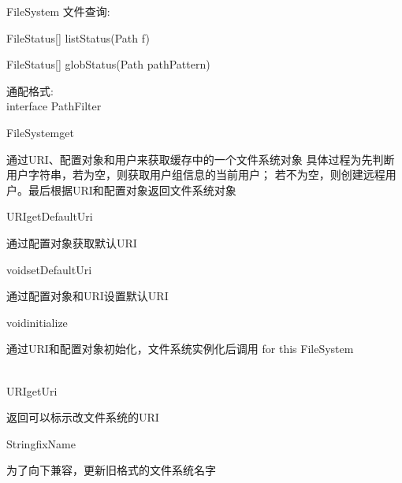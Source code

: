 \begin{XeClass}{FileSystem}
 文件查询: \\
 \begin{XeEnum}
 \item FileStatus[] listStatus(Path f)
 \item FileStatus[] globStatus(Path pathPattern)
 \end{XeEnum}
  
 通配格式: \\
 interface PathFilter

    \begin{XeMethod}{\XePublic}{FileSystem}{get}
         
 通过URI、配置对象和用户来获取缓存中的一个文件系统对象
 具体过程为先判断用户字符串，若为空，则获取用户组信息的当前用户；
 若不为空，则创建远程用户。最后根据URI和配置对象返回文件系统对象

    \end{XeMethod}

    \begin{XeMethod}{\XePublic}{URI}{getDefaultUri}
         
 通过配置对象获取默认URI

    \end{XeMethod}

    \begin{XeMethod}{\XePublic}{void}{setDefaultUri}
         
 通过配置对象和URI设置默认URI

    \end{XeMethod}

    \begin{XeMethod}{\XePublic}{void}{initialize}
         
 通过URI和配置对象初始化，文件系统实例化后调用
 for this FileSystem

    \end{XeMethod}

    \begin{XeMethod}{\XePublic \\ \XeAbstract}{URI}{getUri}
         
 返回可以标示改文件系统的URI

    \end{XeMethod}

    \begin{XeMethod}{\XePrivate}{String}{fixName}
         
 为了向下兼容，更新旧格式的文件系统名字

    \end{XeMethod}


\end{XeClass}

